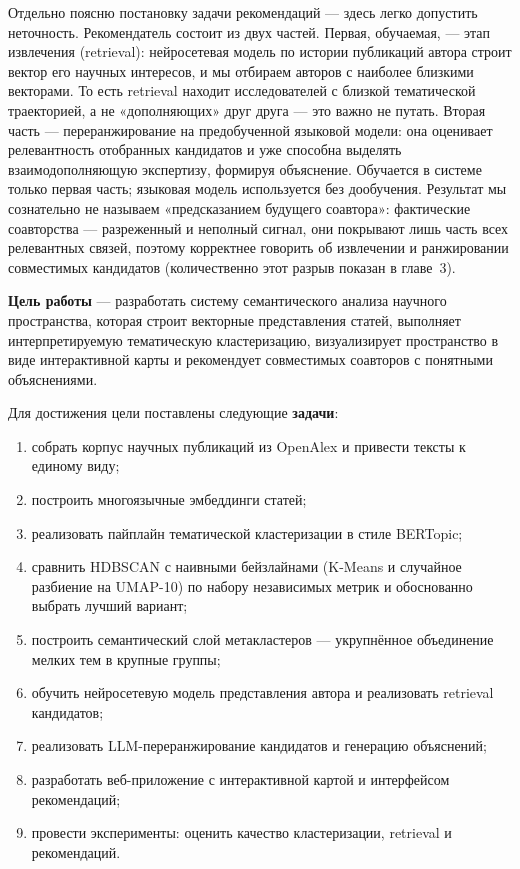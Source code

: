 Отдельно поясню постановку задачи рекомендаций — здесь легко допустить неточность.
Рекомендатель состоит из двух частей. Первая, обучаемая, — этап извлечения (retrieval):
нейросетевая модель по истории публикаций автора строит вектор его научных интересов, и мы
отбираем авторов с наиболее близкими векторами. То есть retrieval находит исследователей с
близкой тематической траекторией, а не «дополняющих» друг друга — это важно не путать. Вторая
часть — переранжирование на предобученной языковой модели: она оценивает релевантность
отобранных кандидатов и уже способна выделять взаимодополняющую экспертизу, формируя
объяснение. Обучается в системе только первая часть; языковая модель используется без
дообучения. Результат мы сознательно не называем «предсказанием будущего соавтора»: фактические
соавторства — разреженный и неполный сигнал, они покрывают лишь часть всех релевантных связей,
поэтому корректнее говорить об извлечении и ранжировании совместимых кандидатов (количественно
этот разрыв показан в главе~3).

\textbf{Цель работы} — разработать систему семантического анализа научного пространства, которая
строит векторные представления статей, выполняет интерпретируемую тематическую кластеризацию,
визуализирует пространство в виде интерактивной карты и рекомендует совместимых соавторов с
понятными объяснениями.

Для достижения цели поставлены следующие \textbf{задачи}:

\begin{enumerate}
  \item собрать корпус научных публикаций из OpenAlex и привести тексты к единому виду;
  \item построить многоязычные эмбеддинги статей;
  \item реализовать пайплайн тематической кластеризации в стиле BERTopic;
  \item сравнить HDBSCAN с наивными бейзлайнами (K-Means и случайное разбиение на UMAP-10)
        по набору независимых метрик и обоснованно выбрать лучший вариант;
  \item построить семантический слой метакластеров — укрупнённое объединение мелких тем в крупные
        группы;
  \item обучить нейросетевую модель представления автора и реализовать retrieval кандидатов;
  \item реализовать LLM-переранжирование кандидатов и генерацию объяснений;
  \item разработать веб-приложение с интерактивной картой и интерфейсом рекомендаций;
  \item провести эксперименты: оценить качество кластеризации, retrieval и рекомендаций.
\end{enumerate}

